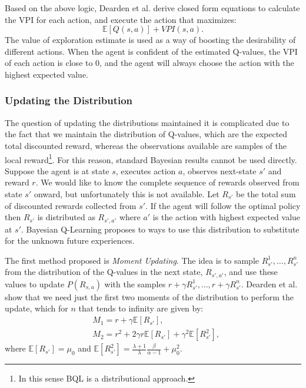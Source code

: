 Based on the above logic, Dearden et al. derive closed form equations to calculate the VPI for each action, and execute the action that maximizes: 
\begin{equation}
	\mathbb{E}[Q(s,a)]+VPI(s,a).
\end{equation}
The value of exploration estimate is used as a way of boosting the desirability of different actions. When the agent is confident of the estimated Q-values, the VPI of each action is close to 0, and the agent will always choose the action with the highest expected value.
\subsubsection{Updating the Distribution}
The question of updating the distributions maintained it is complicated due to the fact that we maintain the distribution of Q-values, which are the expected total discounted reward, whereas the observations available are samples of the local reward\footnote{In this sense BQL is a distributional approach.}. For this reason, standard Bayesian results cannot be used directly. Suppose the agent is at state $s$, executes action $a$, observes next-state $s'$ and reward $r$. We would like to know the complete sequence of rewards observed from state $s'$ onward, but unfortunately this is not available. Let $R_{s'}$ be the total sum of discounted rewards collected from $s'$. If the agent will follow the optimal policy then $R_{s'}$ is distributed as $R_{s',a'}$ where $a'$ is the action with highest expected value at $s'$. Bayesian Q-Learning proposes to ways to use this distribution to substitute for the unknown future experiences.\par
The first method proposed is \emph{Moment Updating}. The idea is to sample $R_{s'}^1, \ldots, R_{s'}^n$ from the distribution of the Q-values in the next state, $R_{s',a'}$, and use these values to update $P(R_{s,a})$ with the samples $r+\gamma R_{s'}^1, \ldots, r+\gamma R_{s'}^n$. Dearden et al. show that we need just the first two moments of the distribution to perform the update, which for $n$ that tends to infinity are given by:
\begin{equation}
\label{eq:moment_updating}
\begin{split}
	& M_1= r+\gamma \mathbb{E}[R_{s'}], \\
	& M_2= r^2+2 \gamma r \mathbb{E}[R_{s'}]+ \gamma^2 \mathbb{E}[R_{s'}^2],
\end{split}
\end{equation} 
where $\mathbb{E}[R_{s'}]=\mu_0$ and $\mathbb{E}[R_{s'}^2]=\frac{\lambda+1}{\lambda} \frac{\beta}{\alpha-1}+ \mu_0^2$.

